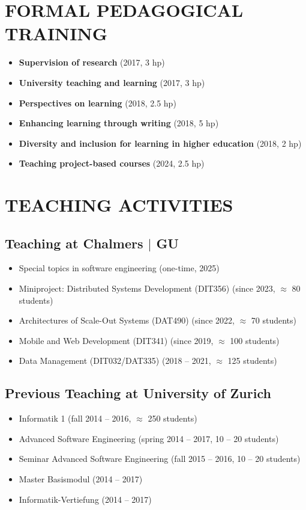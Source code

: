 \documentclass[paper=letter,fontsize=11pt]{scrartcl} %
\newcommand{\NewPart}[2]{\section*{\uppercase{#1} #2}}
\begin{document}
\NewPart{Formal Pedagogical Training}{}

\begin{itemize}
\item \textbf{Supervision of research} (2017, 3 hp)
\item \textbf{University teaching and learning}  (2017, 3 hp)
\item \textbf{Perspectives on learning}  (2018, 2.5 hp)
\item \textbf{Enhancing learning through writing} (2018, 5 hp)
\item \textbf{Diversity and inclusion for learning in higher education} (2018, 2 hp)
\item \textbf{Teaching project-based courses} (2024, 2.5 hp)
\end{itemize}

\NewPart{Teaching Activities}{}

\subsection*{Teaching at Chalmers $|$ GU}
\begin{itemize}
  \item Special topics in software engineering (one-time, 2025)
  \item Miniproject: Distributed Systems Development (DIT356) (since 2023, $\approx$ 80 students)
  \item Architectures of Scale-Out Systems (DAT490) (since 2022, $\approx$ 70 students)
	\item Mobile and Web Development (DIT341) (since 2019, $\approx$ 100 students)
  \item Data Management (DIT032/DAT335) (2018 -- 2021, $\approx$ 125 students)
\end{itemize}

\subsection*{Previous Teaching at University of Zurich}
\begin{itemize}
  \item Informatik 1 (fall 2014 -- 2016, $\approx$ 250 students)
  \item Advanced Software Engineering (spring 2014 -- 2017, 10 -- 20 students)
  \item Seminar Advanced Software Engineering (fall 2015 -- 2016, 10 -- 20 students)
  \item Master Basismodul (2014 -- 2017)
  \item Informatik-Vertiefung (2014 -- 2017)
\end{itemize}
\end{document}
